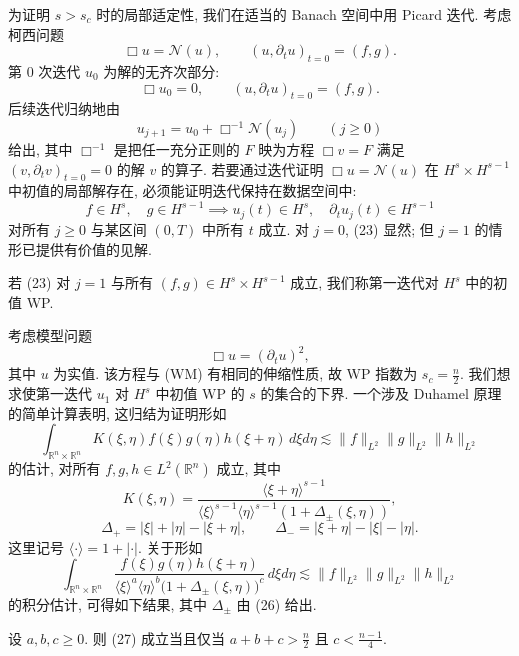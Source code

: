 为证明 $s > s_c$ 时的局部适定性, 我们在适当的 Banach 空间中用 Picard 迭代. 考虑柯西问题
\begin{equation}
\Box u=\mathcal{N}(u),\qquad(u,\partial_{t}u)_{t=0}=(f,g).\end{equation}
第 $0$ 次迭代 $u_{0}$ 为解的无齐次部分:
\[
\Box u_{0}=0,\qquad(u,\partial_{t}u)_{t=0}=(f,g).
\]
后续迭代归纳地由
\[
u_{j+1}=u_{0}+\Box^{-1}\mathcal{N}(u_{j})\qquad (j \geq 0)
\]
给出, 其中 $\Box^{-1}$ 是把任一充分正则的 $F$ 映为方程 $\Box v = F$ 满足 $(v, \partial_t v)_{t=0} = 0$ 的解 $v$ 的算子.
若要通过迭代证明 $\Box u = \mathcal{N}(u)$ 在 $H^s \times H^{s-1}$ 中初值的局部解存在, 必须能证明迭代保持在数据空间中:
\[
f\in H^{s},\quad g\in H^{s-1}\implies u_{j}(t)\in H^{s},\quad\partial_{t}u_{j}(t)\in H^{s-1}
\]
对所有 $j \geq 0$ 与某区间 $(0,T)$ 中所有 $t$ 成立. 对 $j=0$, (23) 显然; 但 $j=1$ 的情形已提供有价值的见解.
\setcounter{mtthm}{4}%

\begin{definition}\label{def:2.5}
若 (23) 对 $j = 1$ 与所有 $(f, g) \in H^s \times H^{s-1}$ 成立, 我们称第一迭代对 $H^s$ 中的初值 WP.\end{definition}

\begin{example}\label{ex:2.1}
考虑模型问题
\begin{equation}
\Box u=(\partial_{t}u)^{2},\end{equation}
其中 $u$ 为实值. 该方程与 (WM) 有相同的伸缩性质, 故 WP 指数为 $s_c = \frac{n}{2}$. 我们想求使第一迭代 $u_1$ 对 $H^s$ 中初值 WP 的 $s$ 的集合的下界. 一个涉及 Duhamel 原理的简单计算表明, 这归结为证明形如
\[
\int_{\mathbb{R}^{n}\times\mathbb{R}^{n}}K(\xi,\eta)f(\xi)g(\eta)h(\xi+\eta)\,d\xi d\eta\lesssim\|f\|_{L^{2}}\|g\|_{L^{2}}\|h\|_{L^{2}}
\]
的估计, 对所有 $f, g, h \in L^{2}(\mathbb{R}^{n})$ 成立, 其中
\[
K\left(\xi,\eta\right)=\frac{\langle\xi+\eta\rangle^{s-1}}{\langle\xi\rangle^{s-1}\langle\eta\rangle^{s-1}\left(1+\Delta_{\pm}(\xi,\eta)\right)},
\]
\[
\Delta_{+}=|\xi|+|\eta|-|\xi+\eta|,\qquad\Delta_{-}=|\xi+\eta|-|\xi|-|\eta|.
\]
这里记号 $\langle\cdot\rangle=1+|\cdot|$.
关于形如
\[
\int_{\mathbb{R}^{n}\times\mathbb{R}^{n}}\frac{f(\xi)g(\eta)h(\xi+\eta)}{\langle\xi\rangle^{a}\langle\eta\rangle^{b}\bigl(1+\Delta_{\pm}(\xi,\eta)\bigr)^{c}}\,d\xi d\eta\lesssim\|f\|_{L^{2}}\|g\|_{L^{2}}\|h\|_{L^{2}}
\]
的积分估计, 可得如下结果, 其中 $\Delta_{\pm}$ 由 (26) 给出.\end{example}

\begin{proposition}\label{prop:2.6}
设 $a, b, c \geq 0$. 则 (27) 成立当且仅当 $a + b + c > \frac{n}{2}$ 且 $c < \frac{n-1}{4}$.\end{proposition}

